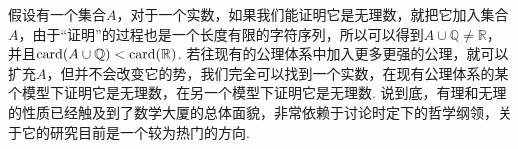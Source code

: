 \documentclass[main.tex]{subfiles}
\begin{document}
假设有一个集合\(A\)，对于一个实数，如果我们能证明它是无理数，就把它加入集合\(A\)，由于“证明”的过程也是一个长度有限的字符序列，所以可以得到\(A\cup\mathbb{Q}\neq \mathbb{R}\)，并且\({\rm card}(A\cup\mathbb{Q})<{\rm card}(\mathbb{R})\). 若往现有的公理体系中加入更多更强的公理，就可以扩充\(A\)，但并不会改变它的势，我们完全可以找到一个实数，在现有公理体系的某个模型下证明它是无理数，在另一个模型下证明它是无理数. 说到底，有理和无理的性质已经触及到了数学大厦的总体面貌，非常依赖于讨论时定下的哲学纲领，关于它的研究目前是一个较为热门的方向.
\end{document}
